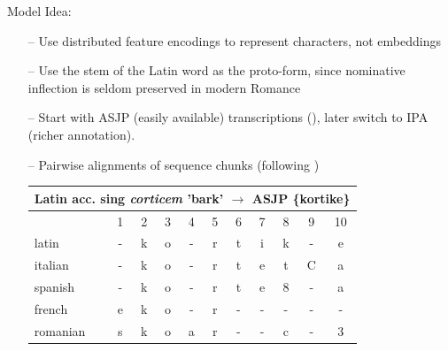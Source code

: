 \documentclass[11pt]{beamer}
\begin{document}
\begin{frame}{Model}
    Idea:
    \begin{itemize}
        \item[--] Use distributed feature encodings to represent characters, not embeddings
        \item[--] Use the stem of the Latin word as the proto-form, since nominative inflection is seldom preserved in modern Romance 
        \item[--] Start with ASJP (easily available) transcriptions (\cite{brown_automated_2008}), later switch to IPA (richer annotation).
        \item[--] Pairwise alignments of sequence chunks (following \cite{ciobanu_ab_2018}) \\
        \begin{center}
        \begin{tabular}{lcccccccccc}
            \hline
            \multicolumn{11}{c}{Latin acc. sing \textit{corticem} 'bark' $\rightarrow$ ASJP \{kortike\}} \\
            \hline
            & 1 & 2 & 3 & 4 & 5 & 6 & 7 & 8 & 9 & 10 \\
            latin & - & k & o & - & r & t & i & k & - & e \\
            italian & - & k & o & - & r & t & e & t & C & a \\
            spanish & - & k & o & - & r & t & e & 8 & - & a \\
            french & e & k & o & - & r & - & - & - & - & - \\
            romanian & s & k & o & a & r & - & - & c & - & 3  
        \end{tabular}
        \end{center}
    \end{itemize}
\end{frame}
\end{document}
